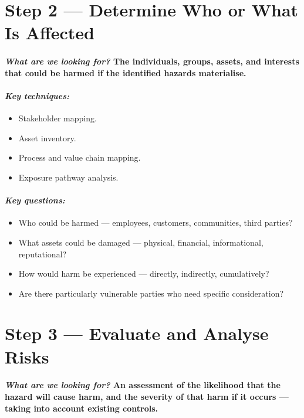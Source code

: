 \section*{Step 2 — Determine Who or What Is Affected}
\paragraph{\textit{What are we looking for?} The individuals, groups, assets, and interests that could be harmed if the identified hazards materialise.}
\paragraph{\textit{Key techniques:}}
\begin{itemize}
  \item{Stakeholder mapping.}
  \item{Asset inventory.}
  \item{Process and value chain mapping.}
  \item{Exposure pathway analysis.}
\end{itemize}

\paragraph{\textit{Key questions:}}
\begin{itemize}
  \item{Who could be harmed — employees, customers, communities, third parties?}
  \item{What assets could be damaged — physical, financial, informational, reputational?}
  \item{How would harm be experienced — directly, indirectly, cumulatively?}
  \item{Are there particularly vulnerable parties who need specific consideration?}
\end{itemize}

\section*{Step 3 — Evaluate and Analyse Risks}
\paragraph{\textit{What are we looking for?} An assessment of the likelihood that the hazard will cause harm, and the severity of that harm if it occurs — taking into account existing controls.}
